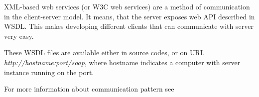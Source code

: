 XML-based web services (or W3C web services) are a method of communication in
the client-server model. It means, that the server exposes web API described in
WSDL. This makes developing different clients that can communicate with
\textan{} server very easy.

These WSDL files are available either in source codes, or on URL \emph{http://hostname:port/soap},
where hostname indicates a computer with \textan{} server instance running on the port.

For more information about communication pattern see 
